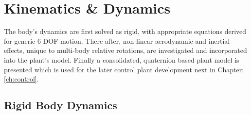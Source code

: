 \chapter{Kinematics \& Dynamics}
\label{ch:dynamics}
The body's dynamics are first solved as rigid, with appropriate equations derived for generic 6-DOF motion. There after, non-linear aerodynamic and inertial effects, unique to multi-body relative rotations, are investigated and incorporated into the plant's model. Finally a consolidated, quaternion based plant model is presented which is used for the later control plant development next in Chapter:\ref{ch:control}.
\section{Rigid Body Dynamics}
\label{sec:dynamics.rigidbody}
